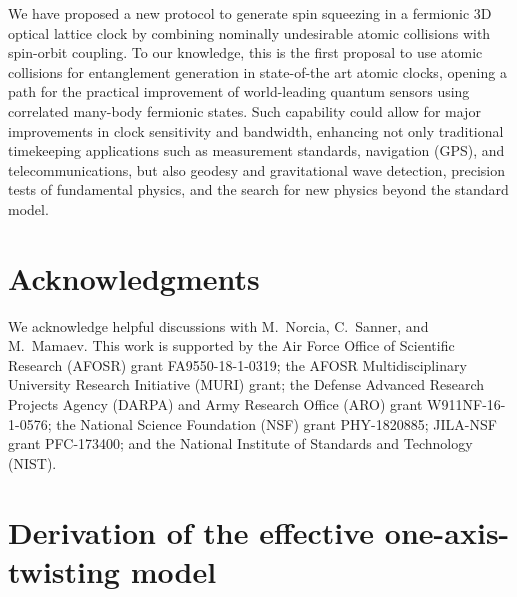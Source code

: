 \documentclass[aps,prx,superscriptaddress,twocolumn]{revtex4-2}
\begin{document}
We have proposed a new protocol to generate spin squeezing in a fermionic 3D optical lattice clock by combining nominally undesirable atomic collisions with spin-orbit coupling.
To our knowledge, this is the first proposal to use atomic collisions for entanglement generation in state-of-the art atomic clocks, opening a path for the practical improvement of world-leading quantum sensors using correlated many-body fermionic states.
Such capability could allow for major improvements in clock sensitivity and bandwidth, enhancing not only traditional timekeeping applications such as measurement standards, navigation (GPS), and telecommunications, but also geodesy and gravitational wave detection, precision tests of fundamental physics, and the search for new physics beyond the standard model\cite{safronova2018search}.


\section{Acknowledgments}

We acknowledge helpful discussions with M.~Norcia, C.~Sanner, and M.~Mamaev.
This work is supported by the Air Force Office of Scientific Research (AFOSR) grant FA9550-18-1-0319; the AFOSR Multidisciplinary University Research Initiative (MURI) grant; the Defense Advanced Research Projects Agency (DARPA) and Army Research Office (ARO) grant W911NF-16-1-0576; the National Science Foundation (NSF) grant PHY-1820885; JILA-NSF grant PFC-173400; and the
National Institute of Standards and Technology (NIST).


\appendix

\renewcommand\thefigure{\thesection\arabic{figure}}

\section{Derivation of the effective one-axis-twisting model}
\label{sec:derivation_OAT}
\end{document}
